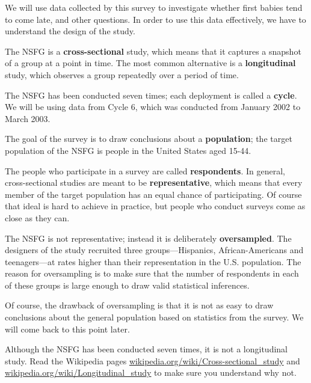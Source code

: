 \documentclass[12pt]{book}
\begin{document}
We will use data collected by this survey to investigate whether first
babies tend to come late, and other questions.  In order to use this
data effectively, we have to understand the design of the study.

The NSFG is a {\bf cross-sectional} study, which means that it
captures a snapshot of a group at a point in time.  The most
common alternative is a {\bf longitudinal} study, which observes a
group repeatedly over a period of time.

The NSFG has been conducted seven times; each deployment is called
a {\bf cycle}.  We will be using data from Cycle 6, which was
conducted from January 2002 to March 2003.

The goal of the survey is to draw conclusions about a
{\bf population}; the target population of the NSFG is people in
the United States aged 15-44.

The people who participate in a survey are called {\bf respondents}.
In general, cross-sectional studies are meant to be {\bf
  representative}, which means that every member of the target
population has an equal chance of participating.  Of course that ideal
is hard to achieve in practice, but people who conduct surveys come as
close as they can.

The NSFG is not representative; instead it is deliberately {\bf
  oversampled}.  The designers of the study recruited three
groups---Hispanics, African-Americans and teenagers---at rates higher
than their representation in the U.S. population.
The reason for oversampling is to make sure that the number of
respondents in each of these groups is large enough to draw valid
statistical inferences.

Of course, the drawback of oversampling is that it is not as easy
to draw conclusions about the general population based on statistics
from the survey.  We will come back to this point later.

\begin{ex}

Although the NSFG has been conducted seven times, it is not a
longitudinal study.  Read the Wikipedia pages
\url{wikipedia.org/wiki/Cross-sectional_study}
and
\url{wikipedia.org/wiki/Longitudinal_study}
to make sure you understand why not.

\end{ex}
\end{document}
